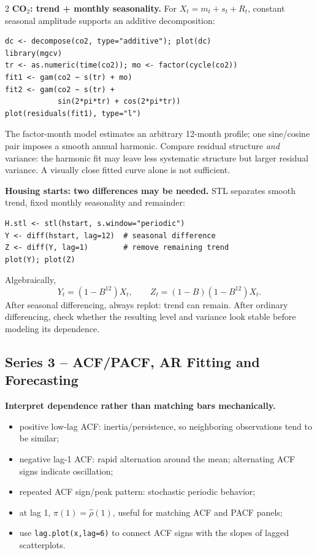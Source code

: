\documentclass[9pt,a4paper]{extarticle}
\newcommand{\key}[1]{\textbf{#1}}
\begin{document}
\begin{multicols}{2}
\key{CO\(_2\): trend + monthly seasonality.} For
\(X_t=m_t+s_t+R_t\), constant seasonal amplitude supports an additive decomposition:
{\scriptsize
\begin{verbatim}
dc <- decompose(co2, type="additive"); plot(dc)
library(mgcv)
tr <- as.numeric(time(co2)); mo <- factor(cycle(co2))
fit1 <- gam(co2 ~ s(tr) + mo)
fit2 <- gam(co2 ~ s(tr) +
            sin(2*pi*tr) + cos(2*pi*tr))
plot(residuals(fit1), type="l")
\end{verbatim}}
The factor-month model estimates an arbitrary 12-month profile; one sine/cosine pair imposes a smooth annual harmonic. Compare residual structure \emph{and} variance: the harmonic fit may leave less systematic structure but larger residual variance. A visually close fitted curve alone is not sufficient.

\key{Housing starts: two differences may be needed.} STL separates smooth trend, fixed monthly seasonality and remainder:
{\scriptsize
\begin{verbatim}
H.stl <- stl(hstart, s.window="periodic")
Y <- diff(hstart, lag=12)  # seasonal difference
Z <- diff(Y, lag=1)        # remove remaining trend
plot(Y); plot(Z)
\end{verbatim}}
Algebraically,
\[
Y_t=(1-B^{12})X_t,\qquad
Z_t=(1-B)(1-B^{12})X_t.
\]
After seasonal differencing, always replot: trend can remain. After ordinary differencing, check whether the resulting level and variance look stable before modeling its dependence.

\subsection*{Series 3 -- ACF/PACF, AR Fitting and Forecasting}

\key{Interpret dependence rather than matching bars mechanically.}
\begin{itemize}
\item positive low-lag ACF: inertia/persistence, so neighboring observations tend to be similar;
\item negative lag-1 ACF: rapid alternation around the mean; alternating ACF signs indicate oscillation;
\item repeated ACF sign/peak pattern: stochastic periodic behavior;
\item at lag 1, \(\boxed{\widehat\pi(1)=\widehat\rho(1)}\), useful for matching ACF and PACF panels;
\item use \texttt{lag.plot(x,lag=6)} to connect ACF signs with the slopes of lagged scatterplots.
\end{itemize}


\end{multicols}
\end{document}
